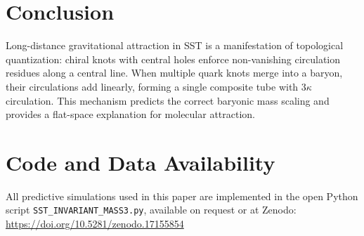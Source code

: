 \documentclass[reprint,aps,onecolumn,nofootinbib]{revtex4-2}
\begin{document}
    \section{Conclusion}
        Long-distance gravitational attraction in SST is a manifestation of topological quantization: chiral knots with central holes enforce non-vanishing circulation residues along a central line.
        When multiple quark knots merge into a baryon, their circulations add linearly, forming a single composite tube with $3\kappa$ circulation.
        This mechanism predicts the correct baryonic mass scaling and provides a flat-space explanation for molecular attraction.

    \section*{Code and Data Availability}
        All predictive simulations used in this paper are implemented in the open Python script \texttt{SST\_INVARIANT\_MASS3.py}, available on request or at Zenodo: \url{https://doi.org/10.5281/zenodo.17155854}


\nocite{*}


\end{document}
